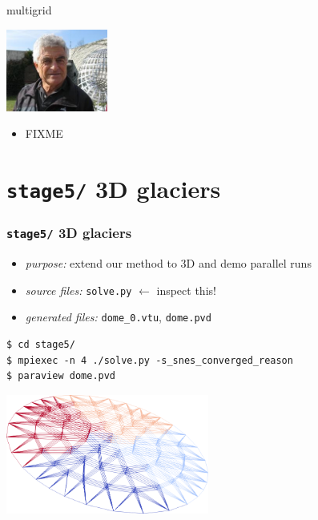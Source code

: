 \documentclass[10pt,hyperref,dvipsnames]{beamer}
\begin{document}
\begin{frame}{multigrid}

\hfill \includegraphics[width=0.25\textwidth]{figs/people/abrandt.jpg}

\vspace{-20mm}

\begin{itemize}
\item FIXME
\end{itemize}
\end{frame}


\section{\texttt{stage5/} \qquad 3D glaciers}

\begin{frame}[fragile]
\frametitle{\texttt{stage5/} \qquad 3D glaciers}

\begin{itemize}
\item \emph{purpose:} extend our method to 3D and demo parallel runs
\item \emph{source files:} \texttt{solve.py} \hfill \alert{$\gets$ inspect this!}
\item \emph{generated files:} \texttt{dome\_0.vtu}, \texttt{dome.pvd}
\end{itemize}

\bigskip
\begin{Verbatim}
$ cd stage5/
$ mpiexec -n 4 ./solve.py -s_snes_converged_reason
$ paraview dome.pvd
\end{Verbatim}

\bigskip
\begin{center}
\includegraphics[width=0.5\textwidth]{figs/stage5.png}
\end{center}
\end{frame}
\end{document}
